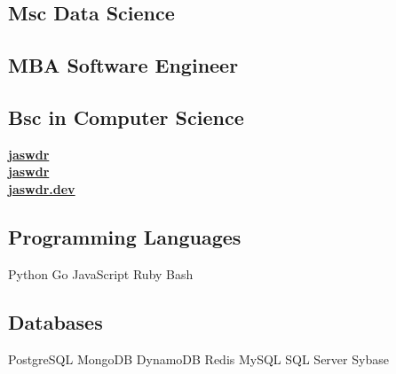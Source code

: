 \documentclass[a4paper]{my_cv}
\begin{document}
\lastupdated


\begin{minipage}[t]{0.33\textwidth} 


\subsection{Msc Data Science}
\vspace{\topsep} %
\sectionsep

\subsection{MBA Software Engineer}
\sectionsep

\subsection{Bsc in Computer Science}
\sectionsep


 \href{https://github.com/jaswdr}{\bf jaswdr} \\
 \href{https://www.linkedin.com/in/jaswdr/}{\bf jaswdr} \\
 \href{https://jaswdr.dev/}{\bf jaswdr.dev}
\sectionsep


\subsection{Programming Languages}
Python \textbullet{} Go \textbullet{} JavaScript \textbullet{} Ruby \textbullet{} Bash
\sectionsep

\subsection{Databases}
PostgreSQL \textbullet{} MongoDB \textbullet{} DynamoDB \textbullet{} Redis \textbullet{} MySQL \textbullet{} SQL Server \textbullet{} Sybase
\sectionsep


\end{minipage}
\end{document}
